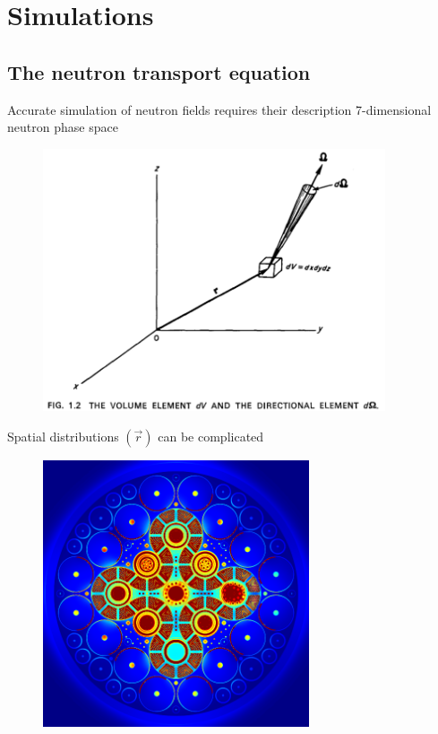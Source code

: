 \documentclass{beamer}
\begin{document}
\section{Simulations}

    \subsection{The neutron transport equation}

        \begin{frame}{Accurate simulation of neutron fields requires their description 7-dimensional neutron phase space}
            \begin{figure}
                \centering
                \includegraphics[width=0.9\textwidth]{./img/phaseSpace.png}
            \end{figure}
        \end{frame}

        \begin{frame}{Spatial distributions $(\vec r)$ can be complicated}
            \begin{figure}
                \centering
                \includegraphics[width=0.7\textwidth]{./img/spaceFlux1.png}
                \caption*{}
            \end{figure}
        \end{frame}
\end{document}
